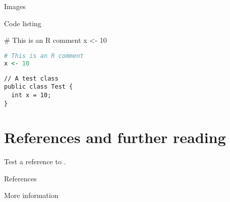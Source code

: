 \lipsum[3]

\begin{frame}{Images}


\end{frame}

\lipsum[4]

\begin{frame}[fragile]{Code listing}

\begin{rcode}
# This is an R comment
x <- 10
\end{rcode}

\begin{lstlisting}[language=R]
# This is an R comment
x <- 10
\end{lstlisting}

\begin{lstlisting}
// A test class
public class Test {
  int x = 10;
}

\end{lstlisting}
\end{frame}

\section*{References and further reading}
Test a reference to \citep{Tantau_2004}.

\begin{frame}[allowframebreaks]{References} 
\scriptsize


\end{frame}

\begin{frame}{More information}
\end{frame}




